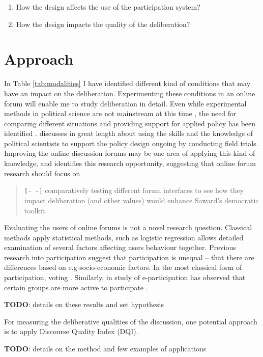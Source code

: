 \documentclass[journal,a4paper]{IEEEtran}
\begin{document}
\begin{enumerate}
\item How the design affects the use of the participation system?
\item How the design impacts the quality of the deliberation?
\end{enumerate}

\section{Approach}

In Table \ref{tab:modalities} I have identified different kind of conditions that may have an impact on the deliberation. Experimenting these conditions in an online forum will enable me to study deliberation in detail. Even while experimental methods in political science are not mainstream at this time \cite{green03,druckman06}, the need for comparing different situations and providing support for applied policy has been identified \cite{stoker10}.  discusses in great length about using the skills and the knowledge of political scientists to support the policy design ongoing by conducting field trials. Improving the online discussion forums may be one area of applying this kind of knowledge, and  identifies this research opportunity, suggesting that online forum research should focus on

\begin{quote}
\texttt{[- -]} comparatively testing different forum interfaces to see how they impact deliberation (and other values) would 
enhance Saward’s democratic toolkit.
\end{quote}

Evaluating the users of online forums is not a novel research question. Classical methods apply statistical methods, such as logistic regression allows detailed examination of several factors affecting users behaviour together. Previous research into participation suggest that participation is unequal -- that there are differences based on e.g socio-economic factors. In the most classical form of participation, voting . Similarly, in study of e-participation has observed that certain groups are more active to participate \cite{albrecht06,strandberg08}.

\textbf{TODO}: details on these results and set hypothesis

For measuring the deliberative qualities of the discussion, one potential approach is to apply  Discourse Quality Index (DQI).

\textbf{TODO}: details on the method and few examples of applications



\end{document}
